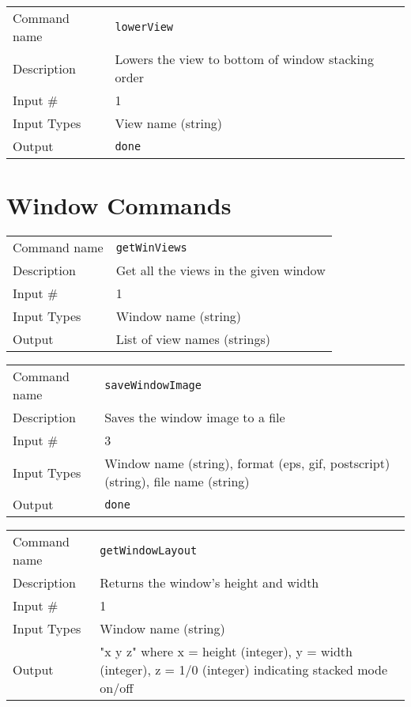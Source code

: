 \noindent
\begin{tabular}{l|p{5in}}
\hline
Command name & {\tt lowerView} \\
Description  & Lowers the view to bottom of window stacking order \\
Input \#     & 1 \\
Input Types  & View name (string) \\
Output       & {\tt done} \\
\hline
\end{tabular}

\section{Window Commands}

\noindent
\begin{tabular}{l|p{5in}}
\hline
Command name & {\tt getWinViews} \\
Description  & Get all the views in the given window \\
Input \#     & 1 \\
Input Types  & Window name (string) \\
Output       & List of view names (strings) \\
\hline
\end{tabular}

\bigskip

\noindent
\begin{tabular}{l|p{5in}}
\hline
Command name & {\tt saveWindowImage} \\
Description  & Saves the window image to a file \\
Input \#     & 3 \\
Input Types  & Window name (string), format (eps, gif, postscript) (string),
               file name (string) \\
Output       & {\tt done} \\
\hline
\end{tabular}

\bigskip

\noindent
\begin{tabular}{l|p{5in}}
\hline
Command name & {\tt getWindowLayout} \\
Description  & Returns the window's height and width \\
Input \#     & 1 \\
Input Types  & Window name (string) \\
Output       & "x y z" where x = height (integer), y = width (integer),
               z = 1/0 (integer) indicating stacked mode on/off \\
\hline
\end{tabular}

